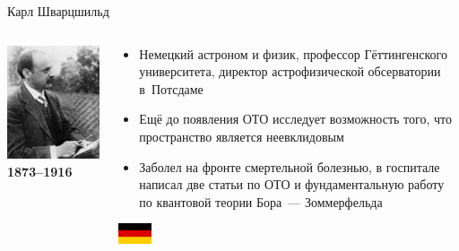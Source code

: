 \documentclass[usenames,dvipsnames,pdftex,unicode,hidelinks]{beamer}
\begin{document}
  \begin{frame}{Карл Шварцшильд}
    \begin{columns}[t]
      \begin{column}{0.25\textwidth}
        \begin{center}
          \includegraphics[width=\textwidth]{schwarzschild}\\
          \textbf{1873--1916}
        \end{center}
      \end{column}
      \begin{column}{0.75\textwidth}
        \begin{itemize}
          \item Немецкий астроном и физик, профессор Гёттингенского университета, директор астрофизической обсерватории в~Потсдаме
          \item Ещё до появления ОТО исследует возможность того, что пространство является неевклидовым
          \item Заболел на фронте смертельной болезнью, в госпитале написал две статьи по ОТО и
            фундаментальную работу по квантовой теории Бора~--- Зоммерфельда

        \end{itemize}
        \begin{center}
          \includegraphics[width=1cm]{germany}
        \end{center}
      \end{column}
    \end{columns}
  \end{frame}
\end{document}
